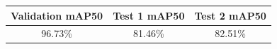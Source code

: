 \begin{tabular}{ccc}
\toprule
Validation mAP50 & Test 1 mAP50 & Test 2 mAP50 \\
\midrule
96.73\% & 81.46\% & 82.51\% \\
\bottomrule
\end{tabular}
